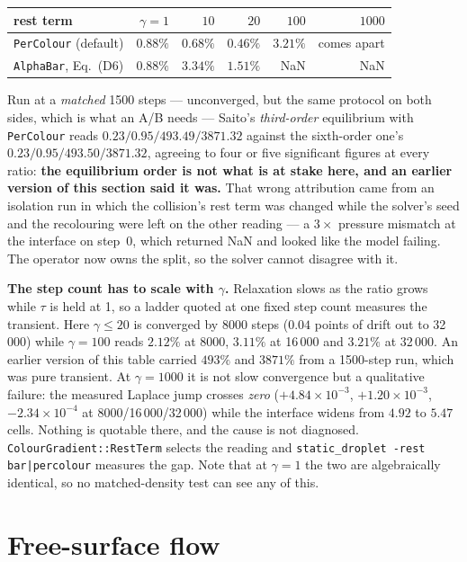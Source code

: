 \documentclass[11pt,a4paper]{article}
\newcommand{\code}[1]{\texttt{\small #1}}
\newcommand{\e}[1]{\times 10^{#1}}
\begin{document}
\begin{center}\small
\begin{tabular}{lrrrrr}
\toprule
rest term & $\gamma = 1$ & $10$ & $20$ & $100$ & $1000$ \\
\midrule
\code{PerColour} (default) & $0.88\%$ & $0.68\%$ & $0.46\%$ & $3.21\%$ & comes apart \\
\code{AlphaBar}, Eq.~(D6)  & $0.88\%$ & $3.34\%$ & $1.51\%$ & NaN & NaN \\
\bottomrule
\end{tabular}
\end{center}

\noindent Run at a \emph{matched} 1500 steps --- unconverged, but the same
protocol on both sides, which is what an A/B needs --- Saito's \emph{third-order}
equilibrium with \code{PerColour} reads $0.23 / 0.95 / 493.49 / 3871.32$ against
the sixth-order one's $0.23 / 0.95 / 493.50 / 3871.32$, agreeing to four or five
significant figures at every ratio: \textbf{the equilibrium order is not what is
at stake here, and an earlier version of this section said it was.} That wrong attribution came from an isolation run in which
the collision's rest term was changed while the solver's seed and the recolouring
were left on the other reading --- a $3\times$ pressure mismatch at the interface
on step~0, which returned NaN and looked like the model failing. The operator now
owns the split, so the solver cannot disagree with it.

\textbf{The step count has to scale with $\gamma$.} Relaxation slows as the ratio
grows while $\tau$ is held at 1, so a ladder quoted at one fixed step count
measures the transient. Here $\gamma \le 20$ is converged by 8000 steps
($0.04$ points of drift out to 32\,000) while $\gamma = 100$ reads $2.12\%$ at
8000, $3.11\%$ at 16\,000 and $3.21\%$ at 32\,000. An earlier version of this
table carried $493\%$ and $3871\%$ from a 1500-step run, which was pure
transient. At $\gamma = 1000$ it is not slow convergence but a qualitative
failure: the measured Laplace jump crosses \emph{zero}
($+4.84\e{-3}$, $+1.20\e{-3}$, $-2.34\e{-4}$ at 8000/16\,000/32\,000) while the
interface widens from $4.92$ to $5.47$ cells. Nothing is quotable there, and the
cause is not diagnosed.
\code{ColourGradient::RestTerm} selects the reading and
\code{static\_droplet -rest bar|percolour} measures the gap. Note that at
$\gamma = 1$ the two are algebraically identical, so no matched-density test can
see any of this.

\section{Free-surface flow}
\label{sec:freesurface}
\end{document}
